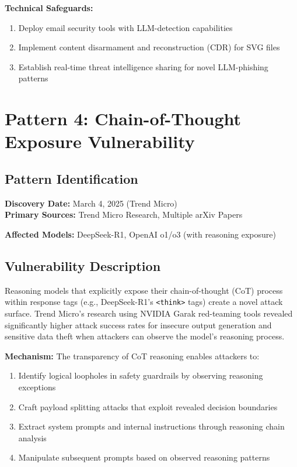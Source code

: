 \documentclass[11pt,a4paper]{article}
\begin{document}
\textbf{Technical Safeguards:}
\begin{enumerate}
\item Deploy email security tools with LLM-detection capabilities
\item Implement content disarmament and reconstruction (CDR) for SVG files
\item Establish real-time threat intelligence sharing for novel LLM-phishing patterns
\end{enumerate}

\section{Pattern 4: Chain-of-Thought Exposure Vulnerability}

\subsection{Pattern Identification}

\textbf{Discovery Date:} March 4, 2025 (Trend Micro)\\
\textbf{Primary Sources:} Trend Micro Research\cite{trendmicro2025deepseek}, Multiple arXiv Papers\cite{arxiv2025hidden}

\textbf{Affected Models:} DeepSeek-R1, OpenAI o1/o3 (with reasoning exposure)

\subsection{Vulnerability Description}

Reasoning models that explicitly expose their chain-of-thought (CoT) process within response tags (e.g., DeepSeek-R1's \texttt{<think>} tags) create a novel attack surface. Trend Micro's research using NVIDIA Garak red-teaming tools revealed significantly higher attack success rates for insecure output generation and sensitive data theft when attackers can observe the model's reasoning process.

\textbf{Mechanism:} The transparency of CoT reasoning enables attackers to:
\begin{enumerate}
\item Identify logical loopholes in safety guardrails by observing reasoning exceptions
\item Craft payload splitting attacks that exploit revealed decision boundaries
\item Extract system prompts and internal instructions through reasoning chain analysis
\item Manipulate subsequent prompts based on observed reasoning patterns
\end{enumerate}
\end{document}
